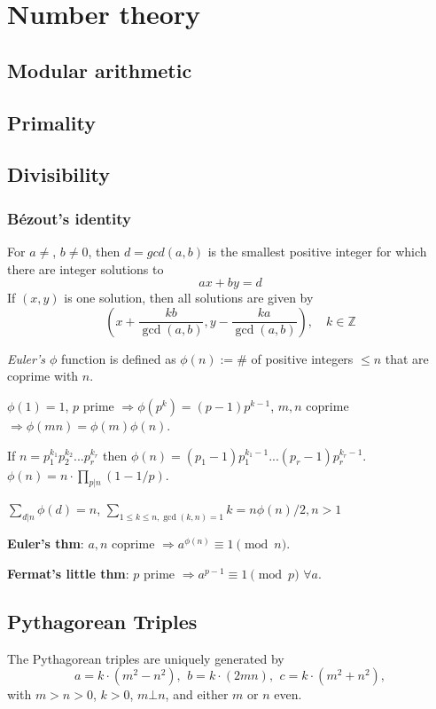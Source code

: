 \chapter{Number theory}

\section{Modular arithmetic}

\section{Primality}

\section{Divisibility}

	\subsection{Bézout's identity}
	For $a \neq $, $b \neq 0$, then $d=gcd(a,b)$ is the smallest positive integer for which there are integer solutions to
	$$ax+by=d$$
	If $(x,y)$ is one solution, then all solutions are given by
	$$\left(x+\frac{kb}{\gcd(a,b)}, y-\frac{ka}{\gcd(a,b)}\right), \quad k\in\mathbb{Z}$$

	\emph{Euler's $\phi$} function is defined as $\phi(n):=\#$ of positive integers $\leq n$ that are coprime with $n$.

    $\phi(1)=1$, $p$ prime $\Rightarrow \phi(p^k)=(p-1)p^{k-1}$, $m,n$ coprime $\Rightarrow \phi(mn)=\phi(m)\phi(n)$.

    If $n=p_1^{k_1}p_2^{k_2} ... p_r^{k_r}$ then $\phi(n) = (p_1-1)p_1^{k_1-1}...(p_r-1)p_r^{k_r-1}$.
    $\phi(n)=n \cdot \prod_{p|n}(1-1/p)$.
    
    $\sum_{d|n} \phi(d) = n$, $\sum_{1\leq k \leq n, \gcd(k,n)=1} k = n \phi(n)/2, n>1$

    \textbf{Euler's thm}: $a,n$ coprime $\Rightarrow a^{\phi(n)} \equiv 1 \pmod{n}$.
    
    \textbf{Fermat's little thm}: $p$ prime $\Rightarrow a^{p-1} \equiv 1 \pmod{p}$ $\forall a$.

\section{Pythagorean Triples}
 The Pythagorean triples are uniquely generated by
 \[ a=k\cdot (m^{2}-n^{2}),\ \,b=k\cdot (2mn),\ \,c=k\cdot (m^{2}+n^{2}), \]
 with $m > n > 0$, $k > 0$, $m \bot n$, and either $m$ or $n$ even.

